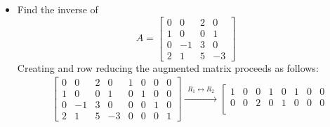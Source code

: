 \documentclass{article}
\begin{document}
\begin{itemize}
\begin{align*}
\begin{array}{cccc|cccc}
0 & 1 & 0 &  0 & -1/8 &     1/4 &  -3/2 & 0 \\
0 & 0 & 1 &  0 &    0 &        0 &    1/2 & 0 \\
0 & 0 &  0 & 1 & 1/40 & -1/20 & -1/10 & -1/5
\end{array}\right] \\ 
& \xrightarrow{\begin{array}{c} R_1 \rightarrow (1/2)R_1 \end{array}}
\left[\begin{array}{cccc|cccc}
1 & 0 & 0 & 0 &   1/4 &     1/2 &      -3 & 0 \\
0 & 1 & 0 & 0 &  -1/8 &     1/4 &  -3/2 & 0 \\
0 & 0 & 1 & 0 &      0 &        0 &    1/2 & 0 \\
0 & 0 & 0 & 1 & 1/40 & -1/20 & -1/10 & -1/5
\end{array}\right]
\end{align*}   
Therefore \(A\) is nonsingular and has the inverse matrix: 
\[A^{-1} = \begin{bmatrix}  
  1/4 &     1/2 &      -3 & 0 \\
 -1/8 &    1/4 &  -3/2  & 0 \\ 
     0 &        0 &    1/2 & 0 \\
1/40 & -1/20 & -1/10 & -1/5
\end{bmatrix}\]
\item Find the inverse of 
\[A = \begin{bmatrix}
0 & 0 & 2 & 0 \\
1 & 0 & 0 & 1 \\
0 & -1 & 3 & 0 \\
2 & 1 & 5 & -3 
\end{bmatrix}\]
Creating and row reducing the augmented matrix proceeds as follows:
\begin{align*}
& \left[\begin{array}{cccc|cccc}
0 & 0 & 2 & 0 & 1 & 0 & 0 & 0 \\
1 & 0 & 0 & 1 & 0 & 1 & 0 & 0 \\
0 & -1 & 3 & 0 & 0 & 0 & 1 & 0 \\
2 & 1 & 5 & -3 & 0 & 0 & 0 & 1
\end{array}\right]
\xrightarrow{\begin{array}{c} R_1 \leftrightarrow R_2 \end{array}}
\left[\begin{array}{cccc|cccc}
1 & 0 & 0 & 1 & 0 & 1 & 0 & 0 \\
0 & 0 & 2 & 0 & 1 & 0 & 0 & 0 \\

\end{array}
\end{align*}
\end{itemize}
\end{document}
